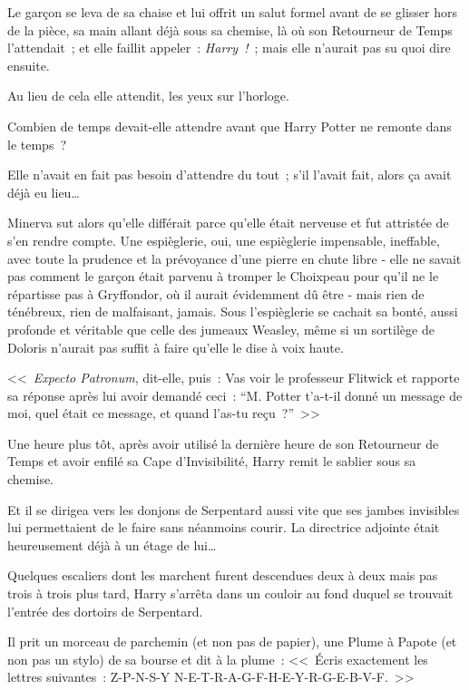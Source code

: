 Le garçon se leva de sa chaise et lui offrit un salut formel avant de se glisser hors de la pièce, sa main allant déjà sous sa chemise, là où son Retourneur de Temps l'attendait~; et elle faillit appeler~: \emph{Harry~!}~; mais elle n'aurait pas su quoi dire ensuite.

Au lieu de cela elle attendit, les yeux sur l'horloge.

Combien de temps devait-elle attendre avant que Harry Potter ne remonte dans le temps~?

Elle n'avait en fait pas besoin d'attendre du tout~; s'il l'avait fait, alors ça avait déjà eu lieu…

Minerva sut alors qu'elle différait parce qu'elle était nerveuse et fut attristée de s'en rendre compte. Une espièglerie, oui, une espièglerie impensable, ineffable, avec toute la prudence et la prévoyance d'une pierre en chute libre - elle ne savait pas comment le garçon était parvenu à tromper le Choixpeau pour qu'il ne le répartisse pas à Gryffondor, où il aurait évidemment dû être - mais rien de ténébreux, rien de malfaisant, jamais. Sous l'espièglerie se cachait sa bonté, aussi profonde et véritable que celle des jumeaux Weasley, même si un sortilège de Doloris n'aurait pas suffit à faire qu'elle le dise à voix haute.

<<~\emph{Expecto Patronum}, dit-elle, puis~: Vas voir le professeur Flitwick et rapporte sa réponse après lui avoir demandé ceci~: “M. Potter t'a-t-il donné un message de moi, quel était ce message, et quand l'as-tu reçu~?”~>>

\later

Une heure plus tôt, après avoir utilisé la dernière heure de son Retourneur de Temps et avoir enfilé sa Cape d'Invisibilité, Harry remit le sablier sous sa chemise.

Et il se dirigea vers les donjons de Serpentard aussi vite que ses jambes invisibles lui permettaient de le faire sans néanmoins courir. La directrice adjointe était heureusement déjà à un étage de lui…

Quelques escaliers dont les marchent furent descendues deux à deux mais pas trois à trois plus tard, Harry s'arrêta dans un couloir au fond duquel se trouvait l'entrée des dortoirs de Serpentard.

Il prit un morceau de parchemin (et non pas de papier), une Plume à Papote (et non pas un stylo) de sa bourse et dit à la plume~: <<~Écris exactement les lettres suivantes~: Z-P-N-S-Y N-E-T-R-A-G-F-H-E-Y-R-G-E-B-V-F.~>>

